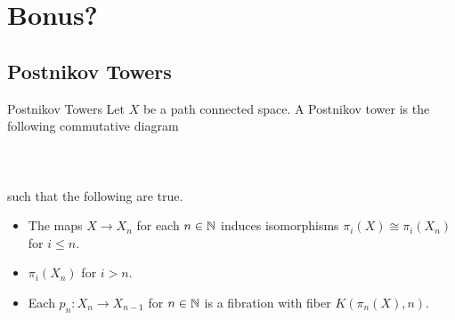\documentclass[a4paper]{article}
\begin{document}
\pagebreak
\section{Bonus?}
\subsection{Postnikov Towers}
\begin{defn}{Postnikov Towers}{} Let $X$ be a path connected space. A Postnikov tower is the following commutative diagram \\~\\
\\~\\
such that the following are true. 
\begin{itemize}
\item The maps $X\to X_n$ for each $n\in\mathbb{N}$ induces isomorphisms $\pi_i(X)\cong\pi_i(X_n)$ for $i\leq n$. 
\item $\pi_i(X_n)$ for $i>n$. 
\item Each $p_n:X_n\to X_{n-1}$ for $n\in\mathbb{N}$ is a fibration with fiber $K(\pi_n(X),n)$. 
\end{itemize}
\end{defn}
\end{document}
